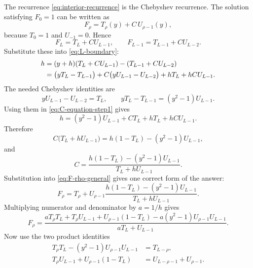 \documentclass[11pt]{article}
\begin{document}
The recurrence \eqref{eq:interior-recurrence} is the Chebyshev recurrence.  The solution satisfying
$F_0=1$ can be written as
\begin{equation}
  F_\rho=T_\rho(y)+C\,U_{\rho-1}(y),
  \label{eq:F-rho-general}
\end{equation}
because $T_0=1$ and $U_{-1}=0$.  Hence
\begin{equation}
  F_L=T_L+C U_{L-1},
  \qquad
  F_{L-1}=T_{L-1}+C U_{L-2}.
\end{equation}
Substitute these into \eqref{eq:L-boundary}:
\begin{align}
  h&=(y+h)(T_L+C U_{L-1})-(T_{L-1}+C U_{L-2})\notag\\
  &=\bigl(yT_L-T_{L-1}\bigr)
  +C\bigl(yU_{L-1}-U_{L-2}\bigr)
  +hT_L+hC U_{L-1}.
  \label{eq:C-equation-step1}
\end{align}
The needed Chebyshev identities are
\begin{equation}
  yU_{L-1}-U_{L-2}=T_L,
  \qquad
  yT_L-T_{L-1}=(y^2-1)U_{L-1}.
  \label{eq:cheb-identities-boundary}
\end{equation}
Using them in \eqref{eq:C-equation-step1} gives
\begin{equation}
  h=(y^2-1)U_{L-1}+C T_L+hT_L+hC U_{L-1}.
\end{equation}
Therefore
\begin{equation}
  C\bigl(T_L+hU_{L-1}\bigr)=h(1-T_L)-(y^2-1)U_{L-1},
\end{equation}
and
\begin{equation}
  C=\frac{h(1-T_L)-(y^2-1)U_{L-1}}{T_L+hU_{L-1}}.
  \label{eq:C-value}
\end{equation}
Substitution into \eqref{eq:F-rho-general} gives one correct form of the answer:
\begin{equation}
  F_\rho=T_\rho+U_{\rho-1}
  \frac{h(1-T_L)-(y^2-1)U_{L-1}}{T_L+hU_{L-1}}.
  \label{eq:F-rho-form1}
\end{equation}
Multiplying numerator and denominator by $a=1/h$ gives
\begin{equation}
  F_\rho=\frac{aT_\rho T_L+T_\rho U_{L-1}+U_{\rho-1}(1-T_L)
  -a(y^2-1)U_{\rho-1}U_{L-1}}{aT_L+U_{L-1}}.
  \label{eq:F-rho-form2}
\end{equation}
Now use the two product identities
\begin{align}
  T_\rho T_L-(y^2-1)U_{\rho-1}U_{L-1}&=T_{L-\rho},
  \label{eq:product-id1}\\
  T_\rho U_{L-1}+U_{\rho-1}(1-T_L)&=U_{L-\rho-1}+U_{\rho-1}.
  \label{eq:product-id2}
\end{align}
\end{document}
